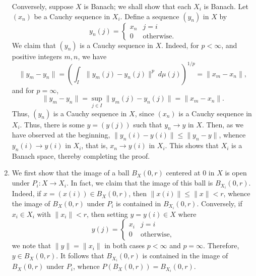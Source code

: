 \documentclass[10pt]{amsart}
\theoremstyle{thmstyle}
\theoremstyle{defstyle}
\renewcommand{\le}{\leqslant}
\begin{document}
\begin{enumerate}[label=(\alph*)]
	Conversely, suppose $X$ is Banach; we shall show that each $X_i$ is Banach. Let $(x_n)$ be a Cauchy sequence in $X_i$. Define a sequence $(y_n)$ in $X$ by 
	\begin{equation*}
		y_n(j) = 
		\begin{cases}
			x_n & j = i\\
			0 & \text{otherwise}.
		\end{cases}
	\end{equation*}
	We claim that $(y_n)$ is a Cauchy sequence in $X$. Indeed, for $p < \infty$, and positive integers $m,n$, we have 
	\begin{equation*}
		\|y_m - y_n\| = \left(\int_I \|y_m(j) - y_n(j)\|^p~d\mu(j)\right)^{1/p} = \|x_m - x_n\|,
	\end{equation*}
	and for $p = \infty$, 
	\begin{equation*}
		\|y_m - y_n\| = \sup_{j\in I}\|y_m(j) - y_n(j)\| = \|x_m - x_n\|.
	\end{equation*}
	Thus, $(y_n)$ is a Cauchy sequence in $X$, since $(x_n)$ is a Cauchy sequence in $X_i$. Thus, there is some $y = (y(j))$ such that $y_n\to y$ in $X$. Then, as we have observed at the beginning, $\|y_n(i) - y(i)\|\le \|y_n - y\|$, whence $y_n(i)\to y(i)$ in $X_i$, that is, $x_n\to y(i)$ in $X_i$. This shows that $X_i$ is a Banach space, thereby completing the proof.

	\item We first show that the image of a ball $B_X(0, r)$ centered at $0$ in $X$ is open under $P_i: X\to X_i$. In fact, we claim that the image of this ball is $B_{X_i}(0, r)$. Indeed, if $x = (x(i))\in B_{X}(0, r)$, then $\|x(i)\|\le \|x\| < r$, whence the image of $B_X(0,r)$ under $P_i$ is contained in $B_{X_i}(0, r)$. Conversely, if $x_i\in X_i$ with $\|x_i\| < r$, then setting $y = y(i)\in X$ where 
	\begin{equation*}
		y(j) = 
		\begin{cases}
			x_i & j = i\\
			0 & \text{otherwise},
		\end{cases}
	\end{equation*}
	we note that $\|y\| = \|x_i\|$ in both cases $p < \infty$ and $p = \infty$. Therefore, $y\in B_X(0, r)$. It follows that $B_{X_i}(0, r)$ is contained in the image of $B_X(0, r)$ under $P_i$, whence $P\left(B_X(0, r)\right) = B_{X_i}(0, r)$.


\end{enumerate}
\end{document}
